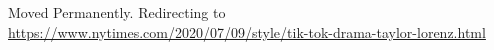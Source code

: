 Moved Permanently. Redirecting to
\url{https://www.nytimes.com/2020/07/09/style/tik-tok-drama-taylor-lorenz.html}
